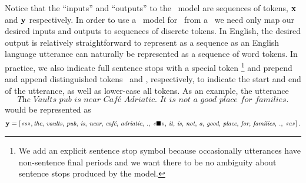 Notice that the ``inputs'' and ``outputs'' to the \sequencetosequence~model are
sequences of tokens, $\mathbf{x}$ and $\mathbf{y}$ respectively.  In order to use a
\sequencetosequence~model for \naturallanguagegeneration~from a
\meaningrepresentation~we need only map our desired inputs and outputs to
sequences of discrete tokens. In English, the desired output is relatively
straightforward to represent as a sequence as an English language utterance can
naturally be represented as a sequence of word tokens. In practice, we also
indicate full sentence stops with a special token \senttok\footnote{We add an
explicit sentence stop symbol because occasionally utterances have non-sentence
final periods and we want there to be no ambiguity about sentence stops
produced by the model.} and prepend and append distinguished tokens
\starttok~and \stoptok, respectively, to indicate the start and end of the
utterance, as well as lower-case all tokens.  As an example, the utterance 
\[
    \textit{The Vaults pub is near Caf{\'e} Adriatic. It is not a good place for families.} 
\]
would be represented as 
\[\small \mathbf{y} = \left[\textit{<<s>>}, \textit{the},\,\textit{vaults},\,\textit{pub},\,\textit{is},\,\textit{near},\,\textit{caf{\'e}},\,\textit{adriatic},\,\textit{.},\,\textit{\textit{<<$\blacksquare$>>}},\,\textit{it},\,\textit{is},\,\textit{not},\,\textit{a},\,\textit{good},\,\textit{place},\,\textit{for},\,\textit{families},\,\textit{.},\,\textit{\textit{<<e>>}}\right]. \]


